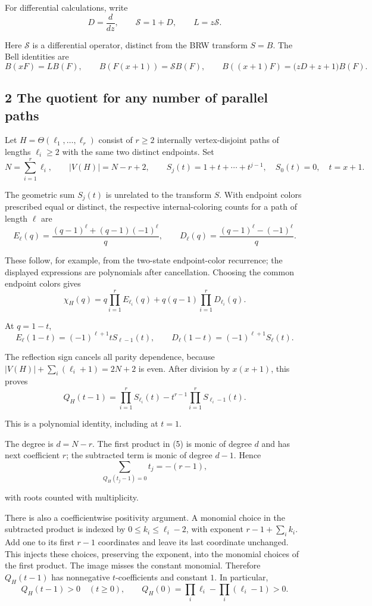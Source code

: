 \documentclass[
  11pt,
  a4paper,
]{article}
\begin{document}
For differential calculations, write
\nopagebreak
\[
D=\frac{d}{dz},\qquad \mathcal S=1+D,\qquad L=z\mathcal S.
\]

Here \(\mathcal S\) is a differential operator, distinct from the BRW
transform \(S=B\). The Bell identities are
\nopagebreak
\[
B(xF)=L B(F),\qquad
B(F(x+1))=\mathcal S B(F),\qquad
B((x+1)F)=\bigl(zD+z+1\bigr)B(F).\tag{4}
\]

\subsection{2 The quotient for any number of parallel
paths}\label{the-quotient-for-any-number-of-parallel-paths}

Let \(H=\Theta(\ell_1,\ldots,\ell_r)\) consist of \(r\geq2\) internally
vertex-disjoint paths of lengths \(\ell_i\geq2\) with the same two
distinct endpoints. Set
\nopagebreak
\[
N=\sum_{i=1}^r\ell_i,\qquad |V(H)|=N-r+2,\qquad
S_j(t)=1+t+\cdots+t^{j-1},\quad S_0(t)=0,\quad t=x+1.
\]

The geometric sum \(S_j(t)\) is unrelated to the transform \(S\). With
endpoint colors prescribed equal or distinct, the respective
internal-coloring counts for a path of length \(\ell\) are
\nopagebreak
\[
E_\ell(q)=\frac{(q-1)^\ell+(q-1)(-1)^\ell}{q},\qquad
D_\ell(q)=\frac{(q-1)^\ell-(-1)^\ell}{q}.
\]

These follow, for example, from the two-state endpoint-color recurrence;
the displayed expressions are polynomials after cancellation. Choosing
the common endpoint colors gives
\nopagebreak
\[
\chi_H(q)=q\prod_{i=1}^rE_{\ell_i}(q)
+q(q-1)\prod_{i=1}^rD_{\ell_i}(q).
\]

At \(q=1-t\),
\nopagebreak
\[
E_\ell(1-t)=(-1)^{\ell+1}tS_{\ell-1}(t),\qquad
D_\ell(1-t)=(-1)^{\ell+1}S_\ell(t).
\]

The reflection sign cancels all parity dependence, because
\(|V(H)|+\sum_i(\ell_i+1)=2N+2\) is even. After division by \(x(x+1)\),
this proves
\nopagebreak
\[
Q_H(t-1)=\prod_{i=1}^rS_{\ell_i}(t)
-t^{r-1}\prod_{i=1}^rS_{\ell_i-1}(t).\tag{5}
\]

This is a polynomial identity, including at \(t=1\).

The degree is \(d=N-r\). The first product in (5) is monic of degree
\(d\) and has next coefficient \(r\); the subtracted term is monic of
degree \(d-1\). Hence
\nopagebreak
\[
\sum_{Q_H(t_j-1)=0}t_j=-(r-1),\tag{6}
\]

with roots counted with multiplicity.

There is also a coefficientwise positivity argument. A monomial choice
in the subtracted product is indexed by \(0\leq k_i\leq\ell_i-2\), with
exponent \(r-1+\sum_i k_i\). Add one to its first \(r-1\) coordinates
and leave its last coordinate unchanged. This injects these choices,
preserving the exponent, into the monomial choices of the first product.
The image misses the constant monomial. Therefore \(Q_H(t-1)\) has
nonnegative \(t\)-coefficients and constant \(1\). In particular,
\nopagebreak
\[
Q_H(t-1)>0\quad(t\geq0),\qquad
Q_H(0)=\prod_i\ell_i-\prod_i(\ell_i-1)>0.\tag{7}
\]
\end{document}
